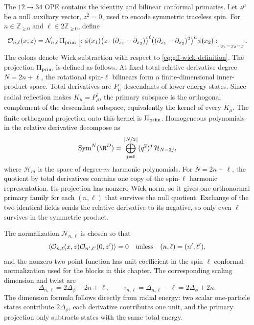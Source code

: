 The \(12\to34\) OPE contains the identity and bilinear conformal primaries.
Let \(z^\mu\) be a null auxiliary vector, \(z^2=0\), used to encode symmetric
traceless spin.  For \(n\in\mathbb Z_{\ge0}\) and
\(\ell\in2\mathbb Z_{\ge0}\), define
\begin{equation}
  \mathcal O_{n,\ell}(x,z)
  =
  \mathcal N_{n,\ell}\,
  \Pi_{\rm prim}
  \left[
    :\phi(x_1)
    \bigl(z\cdot(\partial_{x_1}-\partial_{x_2})\bigr)^\ell
    \bigl((\partial_{x_1}-\partial_{x_2})^2\bigr)^n
    \phi(x_2):
  \right]_{x_1=x_2=x}.
  \label{eq:gff-double-trace-primary-definition}
\end{equation}
The colons denote Wick subtraction with respect to
\eqref{eq:gff-wick-definition}.  The projection \(\Pi_{\rm prim}\) is
defined as follows.  At fixed total relative derivative degree
\(N=2n+\ell\), the rotational spin-\(\ell\) bilinears form a finite-dimensional
inner-product space.  Total derivatives are \(P_\mu\)-descendants of lower
energy states.  Since radial reflection makes \(K_\mu=P_\mu^\dagger\), the
primary subspace is the orthogonal complement of the descendant subspace,
equivalently the kernel of every \(K_\mu\).  The finite orthogonal projection
onto this kernel is \(\Pi_{\rm prim}\).  Homogeneous polynomials in the
relative derivative decompose as
\[
  \operatorname{Sym}^N(\R^D)
  =
  \bigoplus_{j=0}^{\lfloor N/2\rfloor}
  (q^2)^j\,\mathcal H_{N-2j},
\]
where \(\mathcal H_m\) is the space of degree-\(m\) harmonic polynomials.
For \(N=2n+\ell\), the quotient by total derivatives contains one copy of the
spin-\(\ell\) harmonic representation.  Its projection has nonzero Wick norm,
so it gives one
orthonormal primary family for each \((n,\ell)\) that survives the null
quotient.  Exchange of the two identical fields sends the relative derivative
to its negative, so only even \(\ell\) survives in the symmetric product.

The normalization \(\mathcal N_{n,\ell}\) is chosen so that
\[
  \langle
    \mathcal O_{n,\ell}(x,z)
    \mathcal O_{n',\ell'}(0,z')
  \rangle
  =
  0
  \quad\hbox{unless}\quad
  (n,\ell)=(n',\ell'),
\]
and the nonzero two-point function has unit coefficient in the spin-\(\ell\)
conformal normalization used for the blocks in this chapter.  The
corresponding scaling dimension and twist are
\begin{equation}
  \Delta_{n,\ell}=2\Delta_\phi+2n+\ell,
  \qquad
  \tau_{n,\ell}=\Delta_{n,\ell}-\ell=2\Delta_\phi+2n .
  \label{eq:gff-double-trace-dimensions}
\end{equation}
The dimension formula follows directly from radial energy: two scalar
one-particle states contribute \(2\Delta_\phi\), each derivative contributes
one unit, and the primary projection only subtracts states with the same
total energy.


